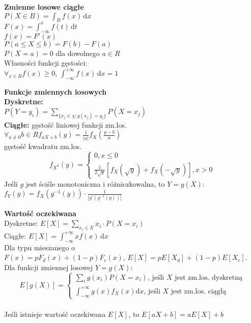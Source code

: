 \documentclass[10pt,landscape,a4paper,notitlepage]{article}
\begin{document}
\begin{multicols*}{4}
        \noindent \textbf{\large Zmienne losowe ciągłe}\\
        $P(X\in B)=\int_{B} f(x)\,\mathrm{d}x$\\
        $F(x)=\int_{-\infty}^xf(t)\,\mathrm{d}t$\\
        $f(x)=F'(x)$\\
        $P(a\leq X\leq b)=F(b)-F(a)$\\
        $P(X = a)=0$ dla dowolnego $a\in R$\\
        Własności funkcji gęstości:\\
        $\forall_{x\in R}f(x)\geq 0$, $\int_{-\infty}^{+\infty}f(x)\,\mathrm{d}x=1$
        

        \noindent\textbf{\large Funkcje zmiennych losowych}\\
        \textbf{Dyskretne:}\\ $P(Y=y_i)=\sum_{\{x_j\in\chi:g(x_j)=y_i\}}P(X=x_j)$\\
        \textbf{Ciągłe:} gęstość liniowej funkcji zm.los.\\ $\forall_{a\neq 0}b\in R f_{aX+b}(y)=\frac{1}{|a|}f_X\left(\frac{y-b}{a}\right)$\\
        gęstość kwadratu zm.los.\\
        \[
            f_{X^2}(y)=
            \begin{cases}
                0, x\leq 0\\
                \frac{1}{2\sqrt{y}}\left[f_X(\sqrt{y})+f_X(-\sqrt{y})\right], x>0
            \end{cases}
        \]
        Jeśli $g$ jest ściśle monotoniczna i różniczkowalna, to $Y=g(X)$: $f_Y(y)=f_X(g^{-1}(y))\cdot\frac{1}{|g'(g^{-1}(y))|}$

        \noindent\textbf{\large Wartość oczekiwana}\\
        Dyskretne: $E[X]=\sum_{x_i\in X}x_i\cdot P(X=x_i)$\\
        Ciągłe: $E[X]=\int_{-\infty}^{+\infty}xf(x)\,\mathrm{d}x$\\
        Dla typu mieszanego o $F(x)=pF_d(x)+(1-p)F_c(x),\,E[X]=pE[X_d]+(1-p)E[X_c]$.\\
        Dla funkcji zmiennej losowej $Y=g(X)$:
        {
            \tiny
            \[
                E[g(X)]=
                \begin{cases}
                    \sum_ig(x_i)P(X=x_i),\,\text{jeśli } X \text{ jest zm.los. dyskretną}\\
                    \int_{-\infty}^{+\infty}g(x)f_X(x)\mathrm{d}x,\,\text{jeśli } X \text{ jest zm.los. ciągłą}
                \end{cases}
            \]
        }\\
        Jeśli istnieje wartość oczekiwana $E[X]$, to $E[aX+b]=aE[X]+b$


\end{multicols*}
\end{document}
